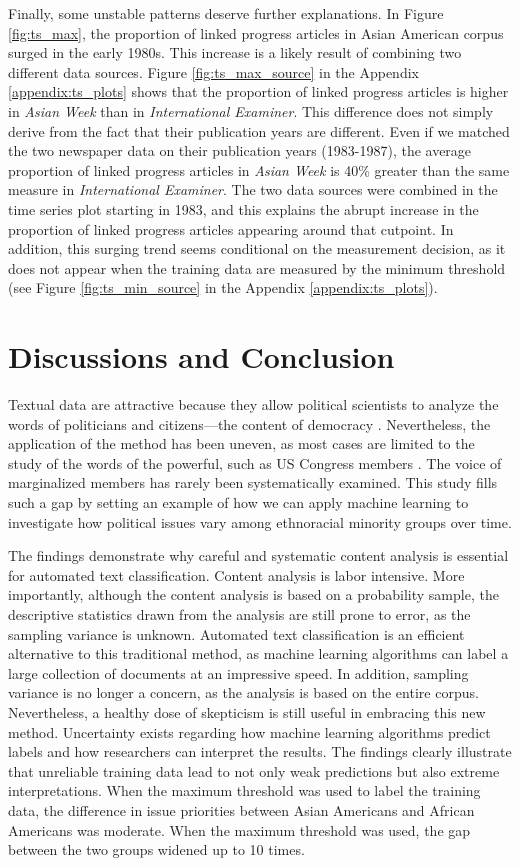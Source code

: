 \documentclass[12 pt]{article}
\begin{document}
Finally, some unstable patterns deserve further explanations. In Figure \ref{fig:ts_max}, the proportion of linked progress articles in Asian American corpus surged in the early 1980s. This increase is a likely result of combining two different data sources. Figure \ref{fig:ts_max_source} in the Appendix \ref{appendix:ts_plots} shows that the proportion of linked progress articles is higher in \textit{Asian Week} than in \textit{International Examiner}. This difference does not simply derive from the fact that their publication years are different. Even if we matched the two newspaper data on their publication years (1983-1987), the average proportion of linked progress articles in \textit{Asian Week} is 40\% greater than the same measure in \textit{International Examiner}. The two data sources were combined in the time series plot starting in 1983, and this explains the abrupt increase in the proportion of linked progress articles appearing around that cutpoint. In addition, this surging trend seems conditional on the measurement decision, as it does not appear when the training data are measured by the minimum threshold (see Figure \ref{fig:ts_min_source} in the Appendix \ref{appendix:ts_plots}).

\section{Discussions and Conclusion}
Textual data are attractive because they allow political scientists to analyze the words of politicians and citizens---the content of democracy \citep[311]{brady2019challenge}. Nevertheless, the application of the method has been uneven, as most cases are limited to the study of the words of the powerful, such as US Congress members \citep{hopkins2010method, grimmer2012words}. The voice of marginalized members has rarely been systematically examined. This study fills such a gap by setting an example of how we can apply machine learning to investigate how political issues vary among ethnoracial minority groups over time.

The findings demonstrate why careful and systematic content analysis is essential for automated text classification. Content analysis is labor intensive. More importantly, although the content analysis is based on a probability sample, the descriptive statistics drawn from the analysis are still prone to error, as the sampling variance is unknown. Automated text classification is an efficient alternative to this traditional method, as machine learning algorithms can label a large collection of documents at an impressive speed. In addition, sampling variance is no longer a concern, as the analysis is based on the entire corpus. Nevertheless, a healthy dose of skepticism is still useful in embracing this new method. Uncertainty exists regarding how machine learning algorithms predict labels and how researchers can interpret the results. The findings clearly illustrate that unreliable training data lead to not only weak predictions but also extreme interpretations. When the maximum threshold was used to label the training data, the difference in issue priorities between Asian Americans and African Americans was moderate. When the maximum threshold was used, the gap between the two groups widened up to 10 times. 
\end{document}
